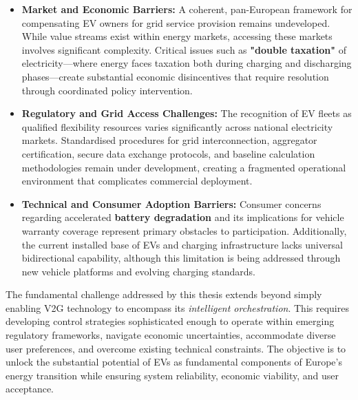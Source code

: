 \begin{itemize}
    \item \textbf{Market and Economic Barriers:} A coherent, pan-European framework for compensating EV owners for grid service provision remains undeveloped. While value streams exist within energy markets, accessing these markets involves significant complexity. Critical issues such as \textbf{"double taxation"} of electricity—where energy faces taxation both during charging and discharging phases—create substantial economic disincentives that require resolution through coordinated policy intervention.
    
    \item \textbf{Regulatory and Grid Access Challenges:} The recognition of EV fleets as qualified flexibility resources varies significantly across national electricity markets. Standardised procedures for grid interconnection, aggregator certification, secure data exchange protocols, and baseline calculation methodologies remain under development, creating a fragmented operational environment that complicates commercial deployment.
    
    \item \textbf{Technical and Consumer Adoption Barriers:} Consumer concerns regarding accelerated \textbf{battery degradation} and its implications for vehicle warranty coverage represent primary obstacles to participation. Additionally, the current installed base of EVs and charging infrastructure lacks universal bidirectional capability, although this limitation is being addressed through new vehicle platforms and evolving charging standards.
\end{itemize}
\noindent
The fundamental challenge addressed by this thesis extends beyond simply enabling V2G technology to encompass its \textit{intelligent orchestration}. This requires developing control strategies sophisticated enough to operate within emerging regulatory frameworks, navigate economic uncertainties, accommodate diverse user preferences, and overcome existing technical constraints. The objective is to unlock the substantial potential of EVs as fundamental components of Europe's energy transition while ensuring system reliability, economic viability, and user acceptance.





